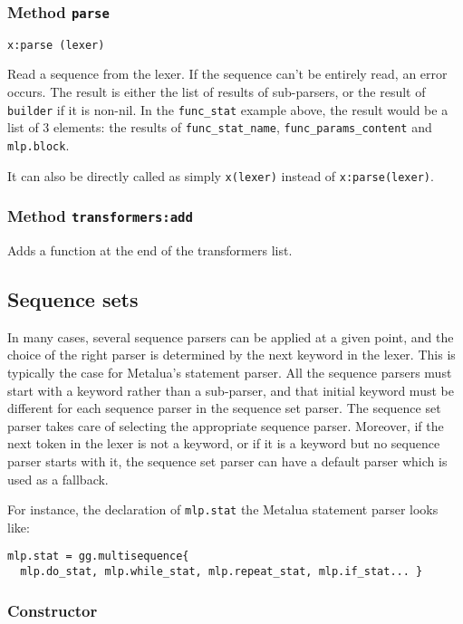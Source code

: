 \subsubsection{Method {\tt parse}}

\begin{verbatim}
x:parse (lexer)
\end{verbatim}

Read a sequence from the lexer. If the sequence can't be entirely
read, an error occurs. The result is either the list of results of
sub-parsers, or the result of \verb|builder| if it is non-nil. In the
\verb|func_stat| example above, the result would be a list of 3
elements: the results of \verb|func_stat_name|,
\verb|func_params_content| and \verb|mlp.block|.

It can also be directly called as simply \verb|x(lexer)| instead of
\verb|x:parse(lexer)|.

\subsubsection{Method {\tt transformers:add}}
Adds a function at the end of the transformers list.

\subsection{Sequence sets}

In many cases, several sequence parsers can be applied at a given
point, and the choice of the right parser is determined by the next
keyword in the lexer. This is typically the case for Metalua's
statement parser. All the sequence parsers must start with a keyword
rather than a sub-parser, and that initial keyword must be different
for each sequence parser in the sequence set parser. The sequence set
parser takes care of selecting the appropriate sequence
parser. Moreover, if the next token in the lexer is not a keyword, or
if it is a keyword but no sequence parser starts with it, the sequence
set parser can have a default parser which is used as a fallback.

For instance, the declaration of \verb|mlp.stat| the Metalua statement
parser looks like:

\begin{verbatim}
mlp.stat = gg.multisequence{
  mlp.do_stat, mlp.while_stat, mlp.repeat_stat, mlp.if_stat... }
\end{verbatim}

\subsubsection{Constructor}

